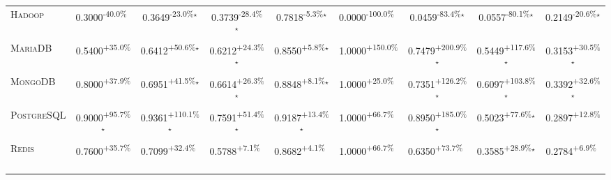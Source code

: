 \begin{table}[htbp]
\begin{tabular}{l|cccc|cccc}
\textsc{Hadoop} & \cellcolor{red!30}0.3000\textsuperscript{-40.0\%}$^{\,\,\,}$ & \cellcolor{red!30}0.3649\textsuperscript{-23.0\%}$^\star$ & \cellcolor{red!30}0.3739\textsuperscript{-28.4\%}$^\star$ & \cellcolor{red!30}0.7818\textsuperscript{-5.3\%}$^\star$ & \cellcolor{red!30}0.0000\textsuperscript{-100.0\%}$^{\,\,\,}$ & \cellcolor{red!30}0.0459\textsuperscript{-83.4\%}$^\star$ & \cellcolor{red!30}0.0557\textsuperscript{-80.1\%}$^\star$ & \cellcolor{red!30}0.2149\textsuperscript{-20.6\%}$^\star$ \\
\textsc{MariaDB} & \cellcolor{green!30}0.5400\textsuperscript{+35.0\%}$^{\,\,\,}$ & \cellcolor{green!30}0.6412\textsuperscript{+50.6\%}$^\star$ & \cellcolor{green!30}0.6212\textsuperscript{+24.3\%}$^\star$ & \cellcolor{green!30}0.8550\textsuperscript{+5.8\%}$^\star$ & \cellcolor{green!30}1.0000\textsuperscript{+150.0\%}$^{\,\,\,}$ & \cellcolor{green!30}0.7479\textsuperscript{+200.9\%}$^\star$ & \cellcolor{green!30}0.5449\textsuperscript{+117.6\%}$^\star$ & \cellcolor{green!30}0.3153\textsuperscript{+30.5\%}$^\star$ \\
\textsc{MongoDB} & \cellcolor{green!30}0.8000\textsuperscript{+37.9\%}$^{\,\,\,}$ & \cellcolor{green!30}0.6951\textsuperscript{+41.5\%}$^\star$ & \cellcolor{green!30}0.6614\textsuperscript{+26.3\%}$^\star$ & \cellcolor{green!30}0.8848\textsuperscript{+8.1\%}$^\star$ & \cellcolor{green!30}1.0000\textsuperscript{+25.0\%}$^{\,\,\,}$ & \cellcolor{green!30}0.7351\textsuperscript{+126.2\%}$^\star$ & \cellcolor{green!30}0.6097\textsuperscript{+103.8\%}$^\star$ & \cellcolor{green!30}0.3392\textsuperscript{+32.6\%}$^\star$ \\
\textsc{PostgreSQL} & \cellcolor{green!30}0.9000\textsuperscript{+95.7\%}$^\star$ & \cellcolor{green!30}0.9361\textsuperscript{+110.1\%}$^\star$ & \cellcolor{green!30}0.7591\textsuperscript{+51.4\%}$^\star$ & \cellcolor{green!30}0.9187\textsuperscript{+13.4\%}$^\star$ & \cellcolor{green!30}1.0000\textsuperscript{+66.7\%}$^{\,\,\,}$ & \cellcolor{green!30}0.8950\textsuperscript{+185.0\%}$^\star$ & \cellcolor{green!30}0.5023\textsuperscript{+77.6\%}$^\star$ & \cellcolor{green!30}0.2897\textsuperscript{+12.8\%}$^{\,\,\,}$ \\
\textsc{Redis} & \cellcolor{green!30}0.7600\textsuperscript{+35.7\%}$^{\,\,\,}$ & \cellcolor{green!30}0.7099\textsuperscript{+32.4\%}$^{\,\,\,}$ & \cellcolor{green!30}0.5788\textsuperscript{+7.1\%}$^{\,\,\,}$ & \cellcolor{green!30}0.8682\textsuperscript{+4.1\%}$^{\,\,\,}$ & \cellcolor{green!30}1.0000\textsuperscript{+66.7\%}$^{\,\,\,}$ & \cellcolor{green!30}0.6350\textsuperscript{+73.7\%}$^{\,\,\,}$ & \cellcolor{green!30}0.3585\textsuperscript{+28.9\%}$^\star$ & \cellcolor{green!30}0.2784\textsuperscript{+6.9\%}$^{\,\,\,}$ \\

\end{tabular}
\end{table}
